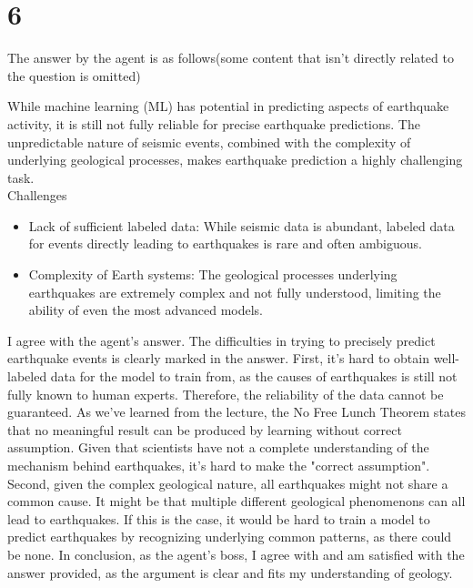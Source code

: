 \documentclass[11pt]{article}
\theoremstyle{definition}
\begin{document}
\section*{6}
The answer by the agent is as follows(some content that isn't directly related to the question is omitted)
\begin{displayquote}
  While machine learning (ML) has potential in predicting aspects of earthquake activity, it is still not fully reliable for precise earthquake predictions. The unpredictable nature of seismic events, combined with the complexity of underlying geological processes, makes earthquake prediction a highly challenging task. \\ 
  Challenges
  \begin{itemize}
    \item Lack of sufficient labeled data: While seismic data is abundant, labeled data for events directly leading to earthquakes is rare and often ambiguous.
    \item Complexity of Earth systems: The geological processes underlying earthquakes are extremely complex and not fully understood, limiting the ability of even the most advanced models.
  \end{itemize}
\end{displayquote}
I agree with the agent's answer. The difficulties in trying to precisely predict earthquake events is clearly marked in the answer. First, it's hard to obtain well-labeled data for the model to train from, as the causes of earthquakes is still not fully known to human experts. Therefore, the reliability of the data cannot be guaranteed. As we've learned from the lecture, the No Free Lunch Theorem states that no meaningful result can be produced by learning without correct assumption. Given that scientists have not a complete understanding of the mechanism behind earthquakes, it's hard to make the "correct assumption". Second, given the complex geological nature, all earthquakes might not share a common cause. It might be that multiple different geological phenomenons can all lead to earthquakes. If this is the case, it would be hard to train a model to predict earthquakes by recognizing underlying common patterns, as there could be none. In conclusion, as the agent's boss, I agree with and am satisfied with the answer provided, as the argument is clear and fits my understanding of geology.
\newpage
\end{document}
